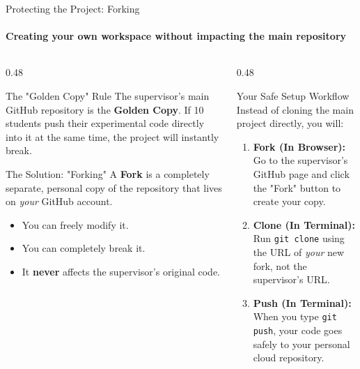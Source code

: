 \begin{frame}{Protecting the Project: Forking}
\framesubtitle{Creating your own workspace without impacting the main repository}

\footnotesize

\begin{columns}[T,onlytextwidth]

    \begin{column}{0.48\textwidth}
        \begin{alertblock}{The "Golden Copy" Rule}
            The supervisor's main GitHub repository is the \textbf{Golden Copy}. If 10 students push their experimental code directly into it at the same time, the project will instantly break.
        \end{alertblock}

        \begin{block}{The Solution: "Forking"}
            A \textbf{Fork} is a completely separate, personal copy of the repository that lives on \textit{your} GitHub account. 
            \begin{itemize}
                \setlength{\itemsep}{0.2em}
                \item You can freely modify it.
                \item You can completely break it.
                \item It \textbf{never} affects the supervisor's original code.
            \end{itemize}
        \end{block}
    \end{column}

    \begin{column}{0.48\textwidth}
        \begin{exampleblock}{Your Safe Setup Workflow}
            Instead of cloning the main project directly, you will:
            \begin{enumerate}
                \setlength{\itemsep}{0.3em}
                \item \textbf{Fork (In Browser):} Go to the supervisor's GitHub page and click the "Fork" button to create your copy.
                \item \textbf{Clone (In Terminal):} Run \texttt{git clone} using the URL of \textit{your} new fork, not the supervisor's URL.
                \item \textbf{Push (In Terminal):} When you type \texttt{git push}, your code goes safely to your personal cloud repository.
            \end{enumerate}
        \end{exampleblock}
    \end{column}

\end{columns}



\end{frame}



